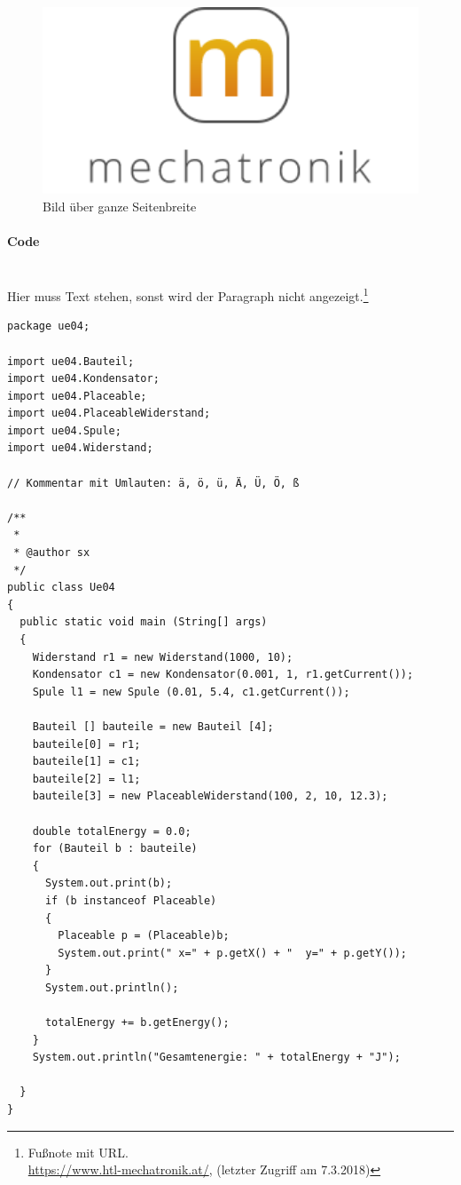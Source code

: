 \begin{figure}[H]
      \includegraphics[width=1\textwidth]{fig/logoMecha}
      \caption{Bild über ganze Seitenbreite}
      \label{Bild über ganze Seitenbreite}
\end{figure}
\newpage

\paragraph{Code}\mbox{}\\
Hier muss Text stehen, sonst wird der Paragraph nicht angezeigt.\footnote{Fußnote mit URL.\\ \url{https://www.htl-mechatronik.at/}, (letzter Zugriff am 7.3.2018)} 

\begin{lstlisting}[style=java,caption=Java Codebeispiel]
package ue04;

import ue04.Bauteil;
import ue04.Kondensator;
import ue04.Placeable;
import ue04.PlaceableWiderstand;
import ue04.Spule;
import ue04.Widerstand;

// Kommentar mit Umlauten: ä, ö, ü, Ä, Ü, Ö, ß

/**
 *
 * @author sx
 */
public class Ue04
{
  public static void main (String[] args)
  {
    Widerstand r1 = new Widerstand(1000, 10);
    Kondensator c1 = new Kondensator(0.001, 1, r1.getCurrent());
    Spule l1 = new Spule (0.01, 5.4, c1.getCurrent());
    
    Bauteil [] bauteile = new Bauteil [4];
    bauteile[0] = r1;
    bauteile[1] = c1;
    bauteile[2] = l1;
    bauteile[3] = new PlaceableWiderstand(100, 2, 10, 12.3);
    
    double totalEnergy = 0.0;
    for (Bauteil b : bauteile)
    {
      System.out.print(b);
      if (b instanceof Placeable)
      {
        Placeable p = (Placeable)b;
        System.out.print(" x=" + p.getX() + "  y=" + p.getY());
      }
      System.out.println();
      
      totalEnergy += b.getEnergy();
    }
    System.out.println("Gesamtenergie: " + totalEnergy + "J");
    
  }
}

\end{lstlisting}
\newpage

